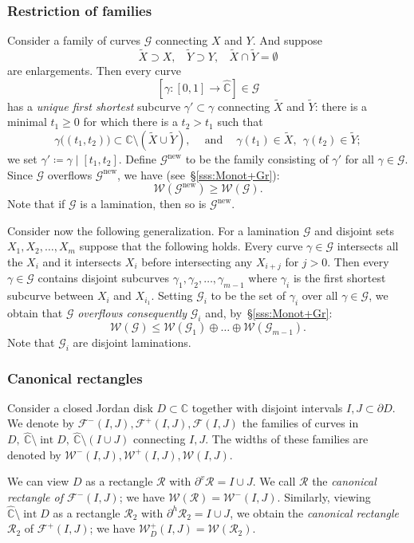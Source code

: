 \documentclass{amsart}
\renewcommand{\sp}{{\ \ }}
\newcommand{\1}{{\mathbb 1 }}
\newcommand{\FamG}{{\mathcal G}}
\newcommand{\Fam}{{\mathcal F}}
\newcommand{\Width}{{\mathcal W}}
\newcommand\RR{\mathcal{R}}
\newcommand\intr{\operatorname{int}}
\newcommand\new{{\operatorname{new}}}
\newcommand{\wC}{\widehat{\mathbb{C}}}
\newcommand{\C}{\mathbb{C}}
\theoremstyle{remark}
\numberwithin{equation}{section}
\theoremstyle{definition}
\begin{document}
\subsubsection{Restriction of families}
\label{sss:short subcurves} Consider a family of curves $\FamG$ connecting $X$ and $Y$. And suppose \[\widetilde X\supset X,\sp\sp  \widetilde Y\supset Y,\sp\sp \widetilde X\cap \widetilde Y=\emptyset\] are enlargements. Then every curve \[[\gamma\colon [0,1]\to \wC]\in \FamG\] 
has a \emph{unique first shortest} subcurve $\gamma'\subset \gamma$ connecting $\widetilde X$ and $\widetilde Y$: there is a minimal $t_1\ge 0$ for which there is a $t_2>t_1$ such that
\[ \gamma\big((t_1,t_2)\big)\subset \C\setminus (\widetilde X\cup \widetilde Y),\sp\sp\text{ and }\sp\sp\gamma(t_1)\in \widetilde X,\sp \gamma(t_2)\in \widetilde Y;\]
we set $\gamma'\coloneqq \gamma\mid[t_1,t_2]$. Define $\FamG^\new$ to be the family consisting of $\gamma'$ for all $\gamma\in \FamG$. Since $\FamG$ overflows $\FamG^\new$, we have (see~\S\ref{sss:Monot+Gr}):
\[\Width(\FamG^\new)\ge \Width(\FamG).\]
Note that if $\FamG$ is a lamination, then so is $\FamG^\new$.

Consider now the following generalization. For a lamination $\FamG$ and disjoint sets $X_1,X_2,\dots, X_m$ suppose that the following holds. Every curve $\gamma\in\FamG$ intersects all the $X_i$ and it intersects $X_i$ before intersecting any $X_{i+j}$ for $j>0$. Then every $\gamma\in \FamG$ contains disjoint subcurves $\gamma_1,\gamma_2,\dots, \gamma_{m-1}$ where $\gamma_i$ is the first shortest subcurve between $X_i$ and $X_{i_1}$. Setting $\FamG_i$ to be the set of $\gamma_i$ over all $\gamma\in \FamG$, we obtain that 
$\FamG$ \emph{overflows consequently} $\FamG_i$ and, by~\S\ref{sss:Monot+Gr}:  
\[\Width(\FamG)\le \Width(\FamG_1)\oplus \dots \oplus \Width(\FamG_{m-1}).\]
Note that $\FamG_i$ are disjoint laminations.


\subsubsection{Canonical rectangles}
\label{sss:can rect} 
Consider a closed Jordan disk $D\subset \C$ together with disjoint intervals $I,J\subset \partial D$. We denote by $\Fam^-(I,J),\Fam^+(I,J), \Fam(I,J)$ the families of curves in $D, \ \wC\setminus \intr D,\  \wC\setminus (I\cup J)$ connecting $I,J$. The widths of these families are denoted by $\Width^-(I,J),\Width^+(I,J), \Width(I,J)$.

We can view $D$ as a rectangle $\RR$ with $\partial^v\RR =I\cup J$. We call $\RR$ the \emph{canonical rectangle of $\Fam^-(I,J)$}; we have $\Width(\RR)=\Width^-(I,J)$. Similarly, viewing $\wC\setminus \intr D$ as a rectangle $\RR_2$ with $\partial^h \RR_2=I\cup J$, we obtain the \emph{canonical rectangle} $\RR_2$ of $\Fam^+(I,J)$; we have $\Width^+_D(I,J)=\Width(\RR_2)$.
\end{document}
